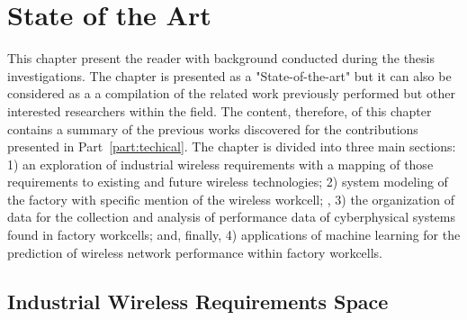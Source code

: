 
\chapter{State of the Art}\label{chapter:soa}

\chapterintro*

This chapter present the reader with background conducted during the thesis investigations. The chapter is presented as a "State-of-the-art" but it can also be considered as a a compilation of the related work previously performed but other interested researchers within the field.  The content, therefore, of this chapter contains a summary of the previous works discovered for the contributions presented in Part~\ref{part:techical}.  The chapter is divided into three main sections: 1) an exploration of industrial wireless requirements with a mapping of those requirements to existing and future wireless technologies; 2) system modeling of the factory with specific mention of the wireless workcell; , 3) the organization of data for the collection and analysis of performance data of cyberphysical systems found in factory workcells; and, finally, 4) applications of machine learning for the prediction of wireless network performance within factory workcells. 

\section{Industrial Wireless Requirements Space}\label{sec:requirements-space}

